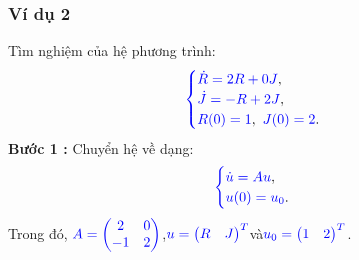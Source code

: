 \documentclass[a4paper]{article}
\begin{document}
\subsubsection{Ví dụ 2}
Tìm nghiệm của hệ phương trình:
\begin{align}
	    \textcolor{blue}{
	    \begin{cases}
            \dot R = 2R + 0J \textcolor{black}{,}\\
            \dot J = -R + 2J \textcolor{black}{,}\\
            R(0) = 1\textcolor{black}{,} \enskip J(0) = 2 \textcolor{black}{.}
        \end{cases}
        }
        \notag
	\end{align}
{\bfseries Bước 1 :} Chuyển hệ về dạng:
\begin{align}
	    \textcolor{blue}{
	    \begin{cases}
            \dot u = Au \textcolor{black}{,}\\
            u(0) = u\sb{0}\textcolor{black}{.}
        \end{cases}
        }
       \notag
	\end{align}
Trong đó,  $\textcolor{blue}{A = \begin{pmatrix} 2 & 0\\ -1 & 2 \end{pmatrix}}$,\enskip $\textcolor{blue}{u = \begin{pmatrix} R & J \end{pmatrix}\sp{T}}$\enskip và\enskip $\textcolor{blue}{u\sb{0} = \begin{pmatrix} 1 & 2 \end{pmatrix}\sp{T}}$.\\\\
\end{document}
